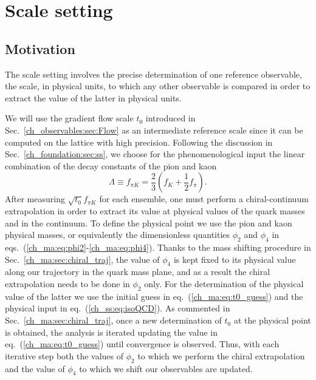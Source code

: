 \chapter{Scale setting}%


\label{ch_ss}


\section{Motivation}
\label{ch_ss:sec:introduction}

The scale setting involves the precise determination of one reference observable, the scale, in physical units, to which any other observable is compared in order to extract the value of the latter in physical units. 

We will use the gradient flow scale $t_0$ introduced in Sec.~\ref{ch_observables:sec:Flow} as an intermediate reference scale since it can be computed on the lattice with high precision. Following the discussion in Sec.~\ref{ch_foundation:sec:ss}, we choose for the phenomenological input the linear combination of the decay constants of the pion and kaon~\citep{Bruno:2016plf}
\begin{equation}
\label{ch_ss:eq:fpik}
\Lambda\equiv f_{\pi K}=\frac{2}{3}\left(f_K+\frac{1}{2}f_{\pi}\right).
\end{equation}
After measuring $\sqrt{t_0}f_{\pi K}$ for each ensemble, one must perform a chiral-continuum extrapolation in order to extract its value at physical values of the quark masses and in the continuum. To define the physical point we use the pion and kaon physical masses, or equivalently the dimensionless quantities $\phi_2$ and $\phi_4$ in eqs.~(\ref{ch_ma:eq:phi2}-\ref{ch_ma:eq:phi4}). Thanks to the mass shifting procedure in Sec.~\ref{ch_ma:sec:chiral_traj}, the value of $\phi_4$ is kept fixed to its physical value along our trajectory in the quark mass plane, and as a result the chiral extrapolation needs to be done in $\phi_2$ only. For the determination of the physical value of the latter we use the initial guess in eq.~(\ref{ch_ma:eq:t0_guess}) and the physical input in eq.~(\ref{ch_ss:eq:isoQCD}). As commented in Sec.~\ref{ch_ma:sec:chiral_traj}, once a new determination of $t_0$ at the physical point is obtained, the analysis is iterated updating the value in eq.~(\ref{ch_ma:eq:t0_guess}) until convergence is observed. Thus, with each iterative step both the values of $\phi_2$ to which we perform the chiral extrapolation and the value of $\phi_4$ to which we shift our observables are updated. 


